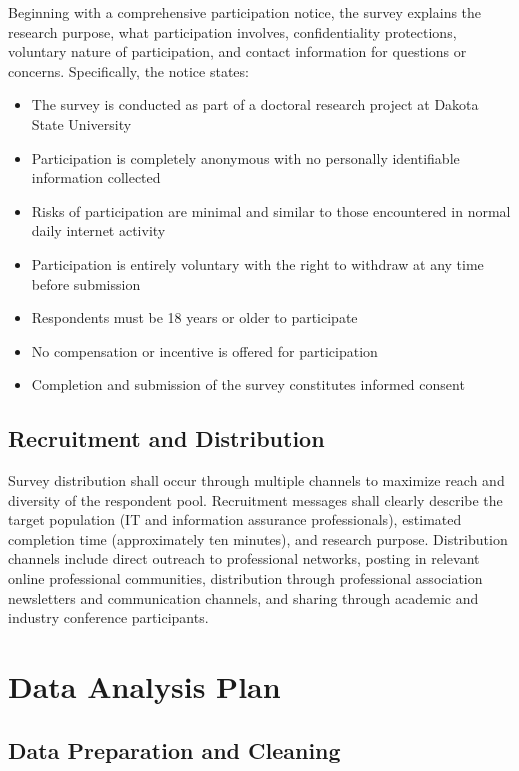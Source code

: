 Beginning with a comprehensive participation notice, the survey explains the research purpose, what participation involves, confidentiality protections, voluntary nature of participation, and contact information for questions or concerns. Specifically, the notice states:

\begin{itemize}
  \item The survey is conducted as part of a doctoral research project at Dakota State University
  \item Participation is completely anonymous with no personally identifiable information collected
  \item Risks of participation are minimal and similar to those encountered in normal daily internet activity
  \item Participation is entirely voluntary with the right to withdraw at any time before submission
  \item Respondents must be 18 years or older to participate
  \item No compensation or incentive is offered for participation
  \item Completion and submission of the survey constitutes informed consent
\end{itemize}

\subsection{Recruitment and Distribution}

Survey distribution shall occur through multiple channels to maximize reach and diversity of the respondent pool. Recruitment messages shall clearly describe the target population (IT and information assurance professionals), estimated completion time (approximately ten minutes), and research purpose. Distribution channels include direct outreach to professional networks, posting in relevant online professional communities, distribution through professional association newsletters and communication channels, and sharing through academic and industry conference participants.

\section{Data Analysis Plan}

\subsection{Data Preparation and Cleaning}

